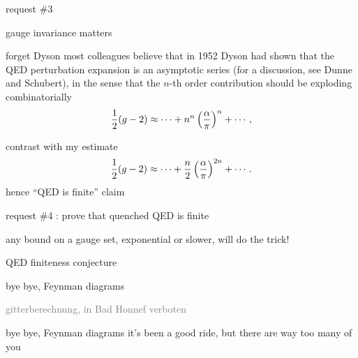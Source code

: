 \begin{frame}{request \#3}
\begin{center}
{\huge gauge invariance matters}
\end{center}
\end{frame}


\begin{frame}{forget Dyson}
most
colleagues believe that in 1952 Dyson had  shown that the
QED perturbation expansion is an asymptotic series (for a discussion, see
Dunne and Schubert), in the sense that the $n$-th order
contribution should be exploding combinatorially
$$
{1 \over 2} (g-2) \approx
\cdots + n^n \left(\frac{\alpha}{\pi}\right)^n + \cdots
\,,
$$

contrast with my estimate
\[
{1 \over 2} (g-2) \approx
\cdots + \frac{n}{2}\left(\frac{\alpha}{\pi}\right)^{2n} + \cdots
\,.
\]
hence ``QED is finite'' claim
\end{frame}

\begin{frame}{request \#4 : prove that quenched QED is finite}
\begin{center}
{\huge any bound on a gauge set, exponential or slower, will do the trick!}
\end{center}
\end{frame}

\begin{frame}{} %
\begin{enumerate}
              \item
QED finiteness conjecture
              \item {\Large
bye bye, Feynman diagrams
                  }\textcolor{gray}{\small
              \item
gitterberechnung\textcolor{yellow!90!black}{, in Bad Honnef verboten}
                    }
\end{enumerate}
\end{frame}


\begin{frame}{bye bye, Feynman diagrams}
it's been a good ride, but there are way too many of you
\end{frame}

